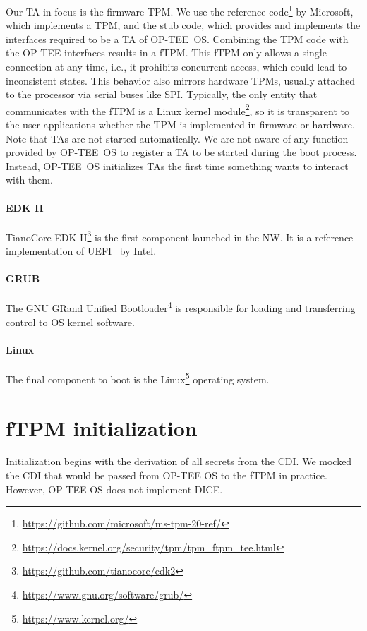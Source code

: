 Our TA in focus is the firmware TPM\@.
We use the reference code\footnote{\url{https://github.com/microsoft/ms-tpm-20-ref/}} by Microsoft, which implements a TPM, and the stub code, which provides and implements the interfaces required to be a TA of OP-TEE~OS\@.
Combining the TPM code with the OP-TEE interfaces results in a \ac{fTPM}\@.
This fTPM only allows a single connection at any time, i.e., it prohibits concurrent access, which could lead to inconsistent states.
This behavior also mirrors hardware TPMs, usually attached to the processor via serial buses like SPI\@.
Typically, the only entity that communicates with the fTPM is a Linux kernel module\footnote{\url{https://docs.kernel.org/security/tpm/tpm_ftpm_tee.html}}, so it is transparent to the user applications whether the TPM is implemented in firmware or hardware.
Note that TAs are not started automatically.
We are not aware of any function provided by OP-TEE~OS to register a TA to be started during the boot process. 
Instead, OP-TEE~OS initializes \acp{TA} the first time something wants to interact with them.

\paragraph{EDK II}
TianoCore EDK II\footnote{\url{https://github.com/tianocore/edk2}} is the first component launched in the \ac{NW}.
It is a reference implementation of UEFI~\cite{UEFI} by Intel.

\paragraph{GRUB}
The GNU GRand Unified Bootloader\footnote{\url{https://www.gnu.org/software/grub/}} is responsible for loading and transferring control to OS kernel software.

\paragraph{Linux}
The final component to boot is the Linux\footnote{\url{https://www.kernel.org/}} operating system.

\section{\Acl{fTPM} initialization}

Initialization begins with the derivation of all secrets from the CDI\@.
We mocked the CDI that would be passed from OP-TEE OS to the fTPM in practice.
However, OP-TEE OS does not implement DICE\@.

